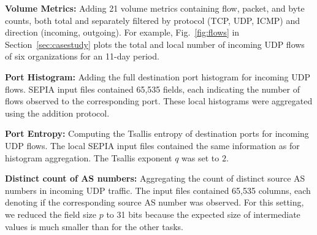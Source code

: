 \documentclass[letterpaper,11pt,onecolumn,titlepage]{article}
\begin{document}
\vspace{1mm}
\begin{compactenum}
\item \textbf{Volume Metrics:} Adding 21 volume metrics containing flow, packet, and
byte counts, both total and separately filtered by protocol (TCP,
UDP, ICMP) and direction (incoming, outgoing). For example,
Fig.~\ref{fig:flows} in Section~\ref{sec:casestudy} plots the total and local number of 
incoming UDP flows of six organizations for an 11-day period. 


\item \textbf{Port Histogram:} Adding the full destination port histogram for
incoming UDP flows. SEPIA input files contained 65,535 fields, 
each indicating the number of flows observed
to the corresponding port. These local histograms were
aggregated using the addition protocol.

\item \textbf{Port Entropy:} Computing the Tsallis entropy of destination ports
for incoming UDP flows. The local SEPIA input files contained the
same information as for histogram aggregation. The Tsallis exponent $q$ was set to $2$.  

\item \textbf{Distinct count of AS numbers:} Aggregating the count of distinct source
AS numbers in incoming UDP traffic. The input files contained
65,535 columns, each denoting if the corresponding source AS
number was observed. 
For this setting, we reduced the field size $p$ to 31 bits because
the expected size of intermediate values is much smaller than for the other tasks.


\end{compactenum}
\vspace{1mm}
\end{document}
